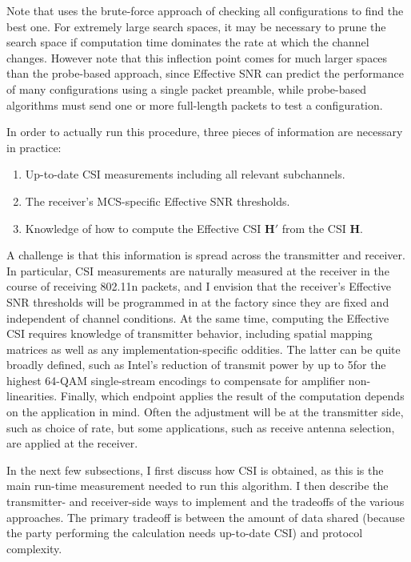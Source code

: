 Note that  uses the brute-force approach of checking all configurations to find the best one. For extremely large search spaces, it may be necessary to prune the search space if computation time dominates the rate at which the channel changes. However note that this inflection point comes for much larger spaces than the probe-based approach, since Effective SNR can predict the performance of many configurations using a single packet preamble, while probe-based algorithms must send one or more full-length packets to test a configuration.

In order to actually run this procedure, three pieces of information are necessary in practice:
\begin{enumerate}[parsep=1ex,itemsep=1ex,topsep=1ex]
	\item Up-to-date CSI measurements including all relevant subchannels.
	\item The receiver's MCS-specific Effective SNR thresholds.
	\item Knowledge of how to compute the Effective CSI $\mathbf{H}'$ from the CSI $\mathbf{H}$.
\end{enumerate}
A challenge is that this information is spread across the transmitter and receiver. In particular, CSI measurements are naturally measured at the receiver in the course of receiving 802.11n packets, and I envision that the receiver's Effective SNR thresholds will be programmed in at the factory since they are fixed and independent of channel conditions. At the same time, computing the Effective CSI requires knowledge of transmitter behavior, including spatial mapping matrices as well as any implementation-specific oddities. The latter can be quite broadly defined, such as Intel's reduction of transmit power by up to 5\dB for the highest 64-QAM single-stream encodings to compensate for amplifier non-linearities. Finally, which endpoint applies the result of the computation depends on the application in mind. Often the adjustment will be at the transmitter side, such as choice of rate, but some applications, such as receive antenna selection, are applied at the receiver.

In the next few subsections, I first discuss how CSI is obtained, as this is the main run-time measurement needed to run this algorithm. I then describe the transmitter- and receiver-side ways to implement  and the tradeoffs of the various approaches. The primary tradeoff is between the amount of data shared (because the party performing the calculation needs up-to-date CSI) and protocol complexity.

